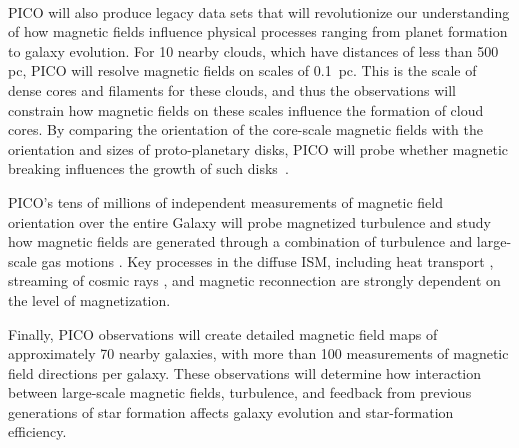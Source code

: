 \documentclass[PICOReport.tex]{subfiles}
\begin{document}

%
\\
PICO will also produce legacy data sets that will revolutionize our understanding of how magnetic fields influence physical processes ranging from planet formation to galaxy evolution.  For 10 nearby clouds, which have distances of less than 500 pc, PICO will resolve magnetic fields on scales of 0.1~pc. This is the scale of dense cores and filaments for these clouds, and thus the observations will constrain how magnetic fields on these scales influence the formation of cloud cores.  By comparing the orientation of the core-scale magnetic fields with the orientation and sizes of proto-planetary disks, PICO will probe whether magnetic breaking influences the growth of such disks~\citep{allen_2003,li_2014}. 

PICO's tens of millions of independent measurements of magnetic field orientation over the entire Galaxy will probe magnetized turbulence and study how magnetic fields are generated through a combination of turbulence and large-scale gas motions \citep{Xu_2018}.   Key processes in the diffuse ISM, including heat transport \citep{Lazarian:2006}, streaming of cosmic rays \citep{Lazarian:2016}, and magnetic reconnection \citep{Lazarian_Vishniac:1999} are strongly dependent on the level of magnetization. 

Finally, PICO observations will create detailed magnetic field maps of approximately 70 nearby galaxies, with more than 100 measurements of magnetic field directions per galaxy. These observations will determine how interaction between large-scale magnetic fields, turbulence, and feedback from previous generations of star formation affects galaxy evolution and star-formation efficiency.

%
%
\end{document}
